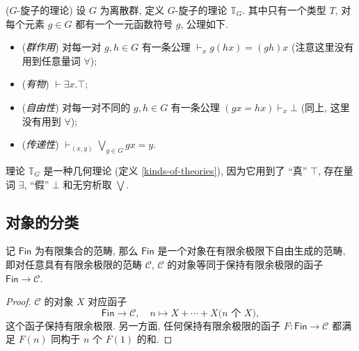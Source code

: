 \begin{definition}
	{($G$-旋子的理论)}
	设 $G$ 为离散群, 定义 $G$-旋子的理论 $\mathbb T_G$.
	其中只有一个类型 $T$, 对每个元素 $g\in G$ 都有一个一元函数符号 $g$, 公理如下.
	\begin{itemize}
		\item (\emph{群作用}) 对每一对 $g,h\in G$ 有一条公理 $\vdash_x g(hx)=(gh)x$ (注意这里没有用到任意量词 $\forall$);
		\item (\emph{有物}) $\vdash \exists x. \top$;
		\item (\emph{自由性}) 对每一对不同的 $g,h\in G$ 有一条公理 $(gx=hx)\vdash_x \bot$ (同上, 这里没有用到 $\forall$);
		\item (\emph{传递性}) $\displaystyle\vdash_{(x,y)}\bigvee_{g\in G}gx=y$.
	\end{itemize}
\end{definition}

理论 $\mathbb T_G$ 是一种几何理论 (定义 \ref{kinds-of-theories}), 因为它用到了 ``真'' $\top$, 存在量词 $\exists$, ``假'' $\bot$ 和无穷析取 $\bigvee$.

\subsection{对象的分类\topos}

\begin{prop}
	[label={fin-free-finite-colimit-category}]
	{}
	记 $\mathsf {Fin}$ 为有限集合的范畴, 那么 $\mathsf {Fin}$ 是一个对象在有限余极限下自由生成的范畴, 即对任意具有有限余极限的范畴 $\mathcal C$,
	$\mathcal C$ 的对象等同于保持有限余极限的函子 $\mathsf {Fin}\to \mathcal C$.
\end{prop}
\begin{proof}
	$\mathcal C$ 的对象 $X$ 对应函子
	$$\mathsf {Fin}\to\mathcal C, \quad n\mapsto X+\cdots+X \text{($n$ 个 $X$)},
	$$
	这个函子保持有限余极限. 另一方面, 任何保持有限余极限的函子 $F\colon \mathsf {Fin}\to\mathcal C$ 都满足 $F(n)$ 同构于 $n$ 个 $F(1)$ 的和.
\end{proof}


